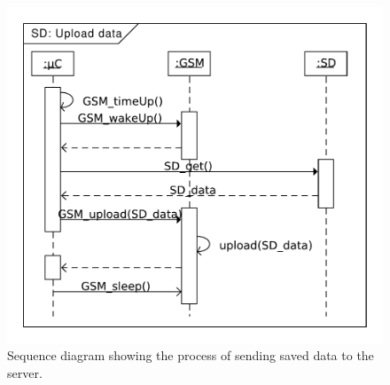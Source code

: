 \begin{figure}
	\centering
	\includegraphics[width=0.7\linewidth]{gfx/Design/SD_Upload.pdf}
	\caption{Sequence diagram showing the process of sending saved data to the server.}
	\label{fig:SD:upload}
\end{figure}



\FloatBarrier